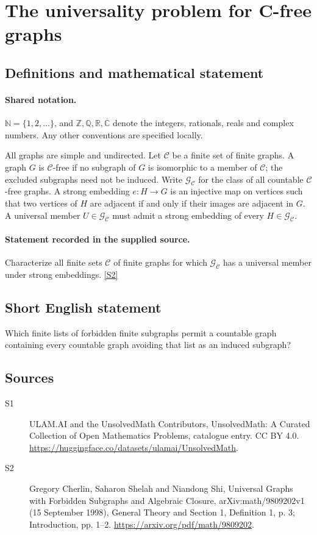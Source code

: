 \documentclass[11pt]{article}
\newcommand{\sref}[2]{\hyperlink{source:#1:#2}{[S#2]}}
\begin{document}
\section{The universality problem for C-free graphs}\label{statement}

\subsection{Definitions and mathematical statement}

\paragraph{Shared notation.}$\mathbb N=\{1,2,\ldots\}$, and $\mathbb Z,\mathbb Q,\mathbb R,\mathbb C$ denote the integers, rationals, reals and complex numbers. Any other conventions are specified locally.


All graphs are simple and undirected. Let $\mathcal C$ be a finite set of finite graphs. A graph $G$ is $\mathcal C$-free if no subgraph of $G$ is isomorphic to a member of $\mathcal C$; the excluded subgraphs need not be induced. Write $\mathcal G_{\mathcal C}$ for the class of all countable $\mathcal C$-free graphs. A strong embedding $e:H\to G$ is an injective map on vertices such that two vertices of $H$ are adjacent if and only if their images are adjacent in $G$. A universal member $U\in\mathcal G_{\mathcal C}$ must admit a strong embedding of every $H\in\mathcal G_{\mathcal C}$.
\paragraph{Statement recorded in the supplied source.}
Characterize all finite sets $\mathcal C$ of finite graphs for which $\mathcal G_{\mathcal C}$ has a universal member under strong embeddings. \sref{statement}{2}
\subsection{Short English statement}
Which finite lists of forbidden finite subgraphs permit a countable graph containing every countable graph avoiding that list as an induced subgraph?
\subsection{Sources}
\begin{description}
\item[\hypertarget{source:statement:1}{S1}] ULAM.AI and the UnsolvedMath Contributors, UnsolvedMath: A Curated Collection of Open Mathematics Problems, catalogue entry. CC BY 4.0. \url{https://huggingface.co/datasets/ulamai/UnsolvedMath}.
\item[\hypertarget{source:statement:2}{S2}] Gregory Cherlin, Saharon Shelah and Niandong Shi, Universal Graphs with Forbidden Subgraphs and Algebraic Closure, arXiv:math/9809202v1 (15 September 1998), General Theory and Section 1, Definition 1, p. 3; Introduction, pp. 1--2. \url{https://arxiv.org/pdf/math/9809202}.
\end{description}
\label{end:statement}
\end{document}
